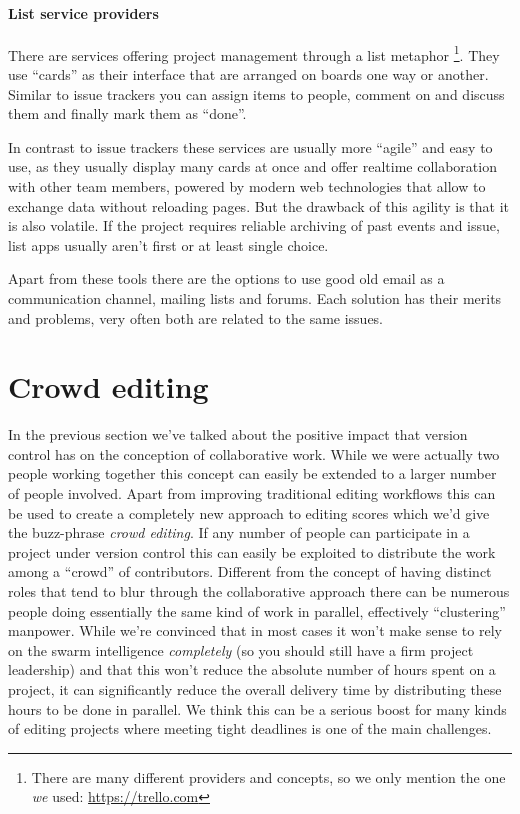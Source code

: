 \documentclass[11pt,a4paper]{article}
\begin{document}
\paragraph{List service providers}
There are services offering project management through a list metaphor%
\footnote{There are many different providers and concepts, so we only mention the one
\emph{we} used: \url{https://trello.com}}.
They use “cards” as their interface that are arranged on boards one way or another.
Similar to issue trackers you can assign items to people, comment on and discuss them and
finally mark them as “done”.

In contrast to issue trackers these services are usually more “agile” and easy to use, as
they usually display many cards at once and offer realtime collaboration with other
team members, powered by modern web technologies that allow to exchange data without
reloading pages. But the drawback of this agility is that it is also volatile.
If the project requires reliable archiving of past events and issue, list apps usually
aren't first or at least single choice.

\medskip
Apart from these tools there are the options to use good old email as a communication channel, mailing lists and forums. Each solution has their merits and problems, very often both are related to the same issues.


\section{Crowd editing}
In the previous section we've talked about the positive impact that version control
has on the conception of collaborative work. While we were actually two people
working together this concept can easily be extended to a larger number of people
involved. Apart from improving traditional editing workflows this can be used to create a
completely new approach to editing scores which we'd give the buzz-phrase \emph{crowd
editing}. If any number of people can participate in a project under version control
this can easily be exploited to distribute the work among a “crowd” of contributors.
Different from the concept of having distinct roles that tend to blur through the
collaborative approach there can be numerous people doing essentially the same kind
of work in parallel, effectively “clustering” manpower. While we're convinced that
in most cases it won't make sense to rely on the swarm intelligence \emph{completely} (so
you should still have a firm project leadership) and that this won't reduce the
absolute number of hours spent on a project, it can significantly reduce the overall
delivery time by distributing these hours to be done in parallel. We think this can
be a serious boost for many kinds of editing projects where meeting tight deadlines
is one of the main challenges.
\end{document}
